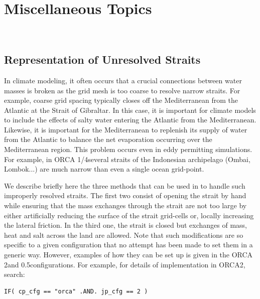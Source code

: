 \chapter{Miscellaneous Topics}
\label{MISC}
\minitoc

\newpage
$\ $\newline    %

\section{Representation of Unresolved Straits}
\label{MISC_strait}

In climate modeling, it often occurs that a crucial connections between water masses
is broken as the grid mesh is too coarse to resolve narrow straits. For example, coarse 
grid spacing typically closes off the Mediterranean from the Atlantic at the Strait of 
Gibraltar. In this case, it is important for climate models to include the effects of salty 
water entering the Atlantic from the Mediterranean. Likewise, it is important for the 
Mediterranean to replenish its supply of water from the Atlantic to balance the net 
evaporation occurring over the Mediterranean region. This problem occurs even in 
eddy permitting simulations. For example, in ORCA 1/4\deg several straits of the Indonesian 
archipelago (Ombai, Lombok...) are much narrow than even a single ocean grid-point.

We describe briefly here the three methods that can be used in \NEMO to handle 
such improperly resolved straits. The first two consist of opening the strait by hand 
while ensuring that the mass exchanges through the strait are not too large by 
either artificially reducing the surface of the strait grid-cells or, locally increasing 
the lateral friction. In the third one, the strait is closed but exchanges of mass, 
heat and salt across the land are allowed.
Note that such modifications are so specific to a given configuration that no attempt 
has been made to set them in a generic way. However, examples of how 
they can be set up is given in the ORCA 2\deg and 0.5\deg configurations. For example, 
for details of implementation in ORCA2, search:
\vspace{-10pt}  
\begin{alltt}  
\tiny    
\begin{verbatim}
IF( cp_cfg == "orca" .AND. jp_cfg == 2 )
\end{verbatim}  
\end{alltt}

